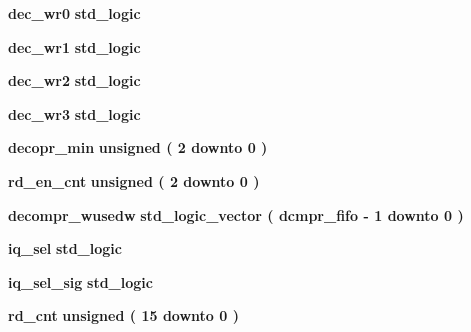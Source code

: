 \begin{DoxyCompactItemize}
\item 
{\bf dec\+\_\+wr0} {\bfseries \textcolor{comment}{std\+\_\+logic}\textcolor{vhdlchar}{ }} 
\item 
{\bf dec\+\_\+wr1} {\bfseries \textcolor{comment}{std\+\_\+logic}\textcolor{vhdlchar}{ }} 
\item 
{\bf dec\+\_\+wr2} {\bfseries \textcolor{comment}{std\+\_\+logic}\textcolor{vhdlchar}{ }} 
\item 
{\bf dec\+\_\+wr3} {\bfseries \textcolor{comment}{std\+\_\+logic}\textcolor{vhdlchar}{ }} 
\item 
{\bf decopr\+\_\+min} {\bfseries \textcolor{comment}{unsigned}\textcolor{vhdlchar}{ }\textcolor{vhdlchar}{(}\textcolor{vhdlchar}{ }\textcolor{vhdlchar}{ } \textcolor{vhdldigit}{2} \textcolor{vhdlchar}{ }\textcolor{keywordflow}{downto}\textcolor{vhdlchar}{ }\textcolor{vhdlchar}{ } \textcolor{vhdldigit}{0} \textcolor{vhdlchar}{ }\textcolor{vhdlchar}{)}\textcolor{vhdlchar}{ }} 
\item 
{\bf rd\+\_\+en\+\_\+cnt} {\bfseries \textcolor{comment}{unsigned}\textcolor{vhdlchar}{ }\textcolor{vhdlchar}{(}\textcolor{vhdlchar}{ }\textcolor{vhdlchar}{ } \textcolor{vhdldigit}{2} \textcolor{vhdlchar}{ }\textcolor{keywordflow}{downto}\textcolor{vhdlchar}{ }\textcolor{vhdlchar}{ } \textcolor{vhdldigit}{0} \textcolor{vhdlchar}{ }\textcolor{vhdlchar}{)}\textcolor{vhdlchar}{ }} 
\item 
{\bf decompr\+\_\+wusedw} {\bfseries \textcolor{comment}{std\+\_\+logic\+\_\+vector}\textcolor{vhdlchar}{ }\textcolor{vhdlchar}{(}\textcolor{vhdlchar}{ }\textcolor{vhdlchar}{ }\textcolor{vhdlchar}{ }\textcolor{vhdlchar}{ }{\bfseries {\bf dcmpr\+\_\+fifo}} \textcolor{vhdlchar}{-\/}\textcolor{vhdlchar}{ } \textcolor{vhdldigit}{1} \textcolor{vhdlchar}{ }\textcolor{keywordflow}{downto}\textcolor{vhdlchar}{ }\textcolor{vhdlchar}{ } \textcolor{vhdldigit}{0} \textcolor{vhdlchar}{ }\textcolor{vhdlchar}{)}\textcolor{vhdlchar}{ }} 
\item 
{\bf iq\+\_\+sel} {\bfseries \textcolor{comment}{std\+\_\+logic}\textcolor{vhdlchar}{ }} 
\item 
{\bf iq\+\_\+sel\+\_\+sig} {\bfseries \textcolor{comment}{std\+\_\+logic}\textcolor{vhdlchar}{ }} 
\item 
{\bf rd\+\_\+cnt} {\bfseries \textcolor{comment}{unsigned}\textcolor{vhdlchar}{ }\textcolor{vhdlchar}{(}\textcolor{vhdlchar}{ }\textcolor{vhdlchar}{ } \textcolor{vhdldigit}{15} \textcolor{vhdlchar}{ }\textcolor{keywordflow}{downto}\textcolor{vhdlchar}{ }\textcolor{vhdlchar}{ } \textcolor{vhdldigit}{0} \textcolor{vhdlchar}{ }\textcolor{vhdlchar}{)}\textcolor{vhdlchar}{ }} 

\end{DoxyCompactItemize}
